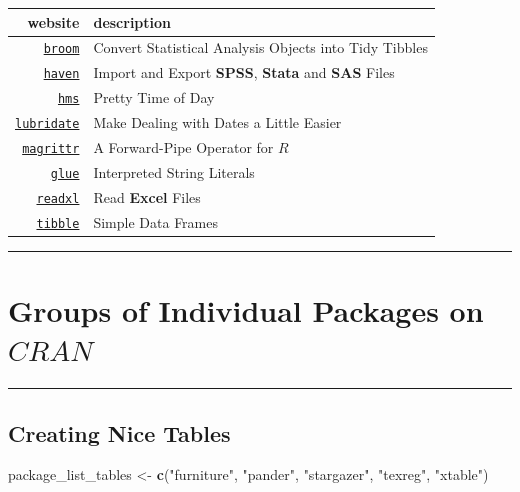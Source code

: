 \documentclass[]{book}
\newenvironment{Shaded}{\begin{snugshade}}{\end{snugshade}}
\newcommand{\KeywordTok}[1]{\textcolor[rgb]{0.13,0.29,0.53}{\textbf{#1}}}
\newcommand{\StringTok}[1]{\textcolor[rgb]{0.31,0.60,0.02}{#1}}
\newcommand{\NormalTok}[1]{#1}
\theoremstyle{definition}
\theoremstyle{definition}
\theoremstyle{definition}
\theoremstyle{remark}
\begin{document}
\begin{longtable}[]{@{}rl@{}}
\toprule
website & description\tabularnewline
\midrule
\endhead
\href{https://github.com/tidymodels/broom}{\texttt{broom}} & Convert
Statistical Analysis Objects into Tidy Tibbles\tabularnewline
\href{https://haven.tidyverse.org/}{\texttt{haven}} & Import and Export
\textbf{SPSS}, \textbf{Stata} and \textbf{SAS} Files\tabularnewline
\href{https://github.com/tidyverse/hms}{\texttt{hms}} & Pretty Time of
Day\tabularnewline
\href{https://lubridate.tidyverse.org/}{\texttt{lubridate}} & Make
Dealing with Dates a Little Easier\tabularnewline
\href{https://magrittr.tidyverse.org/}{\texttt{magrittr}} & A
Forward-Pipe Operator for \textbf{\(R\)}\tabularnewline
\href{https://github.com/tidyverse/glue}{\texttt{glue}} & Interpreted
String Literals\tabularnewline
\href{https://readxl.tidyverse.org/}{\texttt{readxl}} & Read
\textbf{Excel} Files\tabularnewline
\href{https://tibble.tidyverse.org/}{\texttt{tibble}} & Simple Data
Frames\tabularnewline
\bottomrule
\end{longtable}

\begin{center}\rule{0.5\linewidth}{\linethickness}\end{center}

\section{\texorpdfstring{Groups of Individual Packages on
\(CRAN\)}{Groups of Individual Packages on CRAN}}\label{groups-of-individual-packages-on-cran}

\begin{center}\rule{0.5\linewidth}{\linethickness}\end{center}

\subsection{Creating Nice Tables}\label{creating-nice-tables}

\begin{Shaded}
\begin{Highlighting}[]
\NormalTok{package_list_tables <-}\StringTok{  }\KeywordTok{c}\NormalTok{(}\StringTok{"furniture"}\NormalTok{, }
                          \StringTok{"pander"}\NormalTok{, }
                          \StringTok{"stargazer"}\NormalTok{, }
                          \StringTok{"texreg"}\NormalTok{,}
                          \StringTok{"xtable"}\NormalTok{)}
\end{Highlighting}
\end{Shaded}
\end{document}
